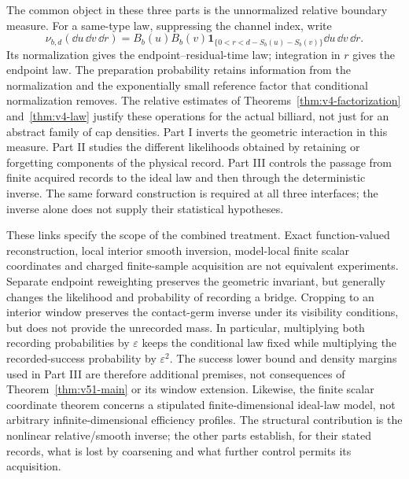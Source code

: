 The common object in these three parts is the unnormalized relative
boundary measure.  For a same-type law, suppressing the channel index,
write
\begin{equation}\label{eq:v52-common-measure}
 \nu_{b,d}(\dd u\,\dd v\,\dd r)
 =B_b(u)B_b(v)\mathbf1_{\{0<r<d-S_b(u)-S_b(v)\}}
                         \dd u\,\dd v\,\dd r.
\end{equation}
Its normalization gives the endpoint--residual-time law; integration
in $r$ gives the endpoint law.  The preparation probability retains
information from the normalization and the exponentially small reference
factor that conditional normalization removes.  The relative estimates
of Theorems~\ref{thm:v4-factorization} and~\ref{thm:v4-law} justify these
operations for the actual billiard, not just for an abstract family of
cap densities.  Part I inverts the geometric interaction in this measure.
Part II studies the different likelihoods obtained by retaining or
forgetting components of the physical record.  Part III controls the
passage from finite acquired records to the ideal law and then through
the deterministic inverse.  The same forward construction is required
at all three interfaces; the inverse alone does not supply their
statistical hypotheses.

These links specify the scope of the combined treatment.  Exact
function-valued reconstruction, local interior smooth inversion,
model-local finite scalar coordinates and charged finite-sample
acquisition are not equivalent experiments.  Separate endpoint
reweighting preserves the geometric invariant, but generally changes
the likelihood and probability of recording a bridge.  Cropping to an
interior window preserves the contact-germ inverse under its visibility
conditions, but does not provide the unrecorded mass.  In particular,
multiplying both recording probabilities by $\varepsilon$ keeps the
conditional law fixed while multiplying the recorded-success probability
by $\varepsilon^2$.  The success lower bound and density margins used
in Part III are therefore additional premises, not consequences of
Theorem~\ref{thm:v51-main} or its window extension.  Likewise, the finite
scalar coordinate theorem concerns a stipulated finite-dimensional
ideal-law model, not arbitrary infinite-dimensional efficiency profiles.
The structural contribution is the nonlinear relative/smooth inverse;
the other parts establish, for their stated records, what is lost by
coarsening and what further control permits its acquisition.


